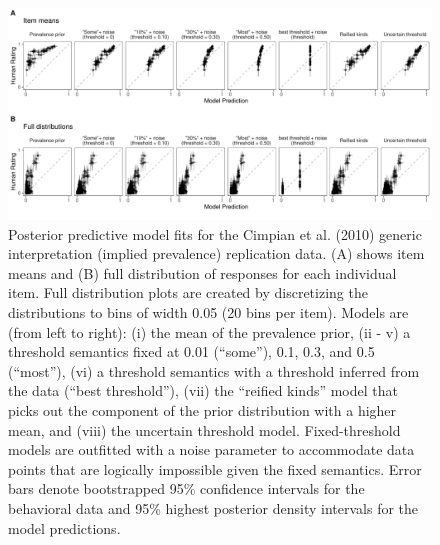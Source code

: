 \documentclass[floatsintext,doc]{apa6}
\begin{document}

\begin{figure}
\centering
\includegraphics{figs/cimpian-modelingResults-plotgrid-scatters.pdf}
\caption{\label{fig:cimpian-modelingResults-scatters}Posterior predictive model fits for the Cimpian et al. (2010) generic interpretation (implied prevalence) replication data. (A) shows item means and (B) full distribution of responses for each individual item. Full distribution plots are created by discretizing the distributions to bins of width 0.05 (20 bins per item). Models are (from left to right): (i) the mean of the prevalence prior, (ii - v) a threshold semantics fixed at 0.01 (\enquote{some}), 0.1, 0.3, and 0.5 (``most''), (vi) a threshold semantics with a threshold inferred from the data (``best threshold''), (vii) the ``reified kinds'' model that picks out the component of the prior distribution with a higher mean, and (viii) the uncertain threshold model. Fixed-threshold models are outfitted with a noise parameter to accommodate data points that are logically impossible given the fixed semantics. Error bars denote bootstrapped 95\% confidence intervals for the behavioral data and 95\% highest posterior density intervals for the model predictions.}
\end{figure}
\end{document}
